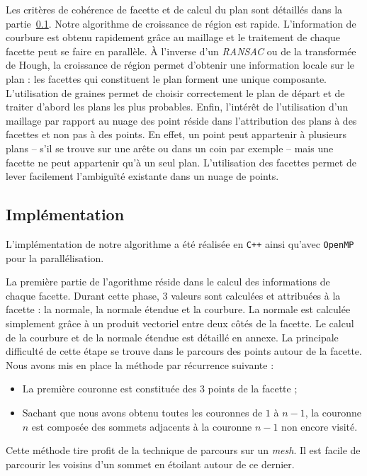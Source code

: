 ﻿\documentclass[12pt, twoside]{article}
\begin{document}
Les critères de cohérence de facette et de calcul du plan sont détaillés dans la partie~\ref{subsec:growthimpl}. Notre algorithme de croissance de région est rapide. L'information de courbure est obtenu rapidement grâce au maillage et le traitement de chaque facette peut se faire en parallèle. À l'inverse d'un \textit{RANSAC} ou de la transformée de Hough, la croissance de région permet d'obtenir une information locale sur le plan : les facettes qui constituent le plan forment une unique composante. L'utilisation de graines permet de choisir correctement le plan de départ et de traiter d'abord les plans les plus probables. Enfin, l'intérêt de l'utilisation d'un maillage par rapport au nuage des point réside dans l'attribution des plans à des facettes et non pas à des points. En effet, un point peut appartenir à plusieurs plans -- s'il se trouve sur une arête ou dans un coin par exemple -- mais une facette ne peut appartenir qu'à un seul plan. L'utilisation des facettes permet de lever facilement l'ambiguïté existante dans un nuage de points.

\subsection{Implémentation}
\label{subsec:growthimpl}
L'implémentation de notre algorithme a été réalisée en \texttt{C++} ainsi qu'avec \texttt{OpenMP} pour la parallélisation.

La première partie de l'agorithme réside dans le calcul des informations de chaque facette. Durant cette phase, 3 valeurs sont calculées et attribuées à la facette : la normale, la normale étendue et la courbure. La normale est calculée simplement grâce à un produit vectoriel entre deux côtés de la facette. Le calcul de la courbure et de la normale étendue est détaillé en annexe. La principale difficulté de cette étape se trouve dans le parcours des points autour de la facette. Nous avons mis en place la méthode par récurrence suivante :
\begin{itemize}
  \item La première couronne est constituée des 3 points de la facette ;
  \item Sachant que nous avons obtenu toutes les couronnes de $1$ à $n-1$, la couronne $n$ est composée des sommets adjacents à la couronne $n-1$ non encore visité.
\end{itemize}
Cette méthode tire profit de la technique de parcours sur un \textit{mesh}. Il est facile de parcourir les voisins d'un sommet en étoilant autour de ce dernier.
\end{document}
